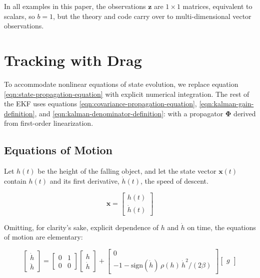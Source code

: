 \documentclass[10pt,oneside,x11names]{article}
\begin{document}
\noindent In all examples in this paper, the observations \(\mathbold{z}\) are
\(1\times{1}\) matrices, equivalent to scalars, so \(b=1\), but the theory and code
carry over to multi-dimensional vector observations.

\section{Tracking with Drag}
\label{sec:orgheadline9}

To accommodate nonlinear equations of state evolution, we replace equation
\ref{eqn:state-propagation-equation} with explicit numerical integration. The
rest of the EKF uses equations \ref{eqn:covariance-propagation-equation},
\ref{eqn:kalman-gain-definition}, and \ref{eqn:kalman-denominator-definition}:
with a propagator \(\mathbold{\Phi}\) derived from first-order linearization.

\subsection{Equations of Motion}
\label{sec:orgheadline5}

Let \(h(t)\) be the height of
the falling object, and let the state vector \(\mathbold{x}(t)\) contain \(h(t)\)
and its first derivative, \(\dot{h}(t)\), the speed of descent.

\begin{equation*}
\mathbold{x} = 
\begin{bmatrix} { h } (t) \\ \dot { h } (t) \end{bmatrix}
\end{equation*}

Omitting, for clarity's sake, explicit dependence of \(h\) and \(\dot{h}\) on time,
the equations of motion are elementary:

\begin{equation}
\label{eqn:equations-of-motion}
\begin{bmatrix} \dot { h } \\ \ddot { h }  \end{bmatrix}
=
\begin{bmatrix}
0 & 1 \\
0 & 0
\end{bmatrix}
\begin{bmatrix} h \\ \dot { h }  \end{bmatrix}
+
\begin{bmatrix} 0 \\ -1 - \textrm{sign}({\dot{h}})\,\rho(h)\,{{\dot{h}}^2}/(2\beta)
\end{bmatrix}
\begin{bmatrix} g \end{bmatrix}
\end{equation}
\end{document}
